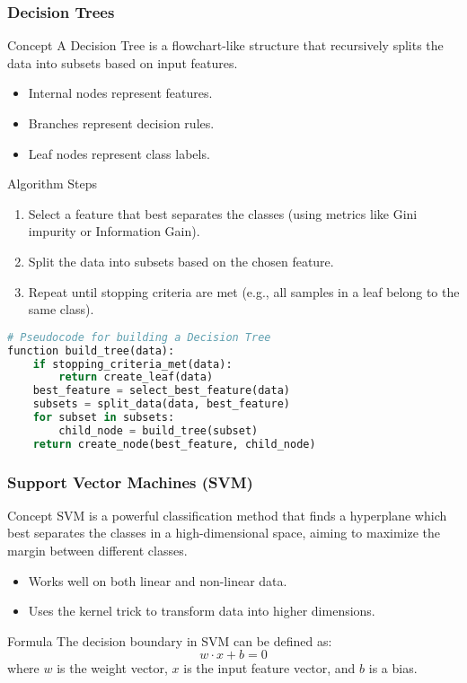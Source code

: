 \documentclass[aspectratio=169]{beamer}
\begin{document}
\begin{frame}[fragile]
    \frametitle{Decision Trees}
    \begin{block}{Concept}
        A Decision Tree is a flowchart-like structure that recursively splits the data into subsets based on input features.
    \end{block}
    \begin{itemize}
        \item Internal nodes represent features.
        \item Branches represent decision rules.
        \item Leaf nodes represent class labels.
    \end{itemize}
    \begin{block}{Algorithm Steps}
        \begin{enumerate}
            \item Select a feature that best separates the classes (using metrics like Gini impurity or Information Gain).
            \item Split the data into subsets based on the chosen feature.
            \item Repeat until stopping criteria are met (e.g., all samples in a leaf belong to the same class).
        \end{enumerate}
    \end{block}
    \begin{lstlisting}[language=Python, basicstyle=\small]
# Pseudocode for building a Decision Tree
function build_tree(data):
    if stopping_criteria_met(data):
        return create_leaf(data)
    best_feature = select_best_feature(data)
    subsets = split_data(data, best_feature)
    for subset in subsets:
        child_node = build_tree(subset)
    return create_node(best_feature, child_node)
    \end{lstlisting}
\end{frame}

\begin{frame}
    \frametitle{Support Vector Machines (SVM)}
    \begin{block}{Concept}
        SVM is a powerful classification method that finds a hyperplane which best separates the classes in a high-dimensional space, aiming to maximize the margin between different classes.
    \end{block}
    \begin{itemize}
        \item Works well on both linear and non-linear data.
        \item Uses the kernel trick to transform data into higher dimensions.
    \end{itemize}
    \begin{block}{Formula}
        The decision boundary in SVM can be defined as:
        \[
        w \cdot x + b = 0
        \]
        where \( w \) is the weight vector, \( x \) is the input feature vector, and \( b \) is a bias.
    \end{block}
\end{frame}
\end{document}
